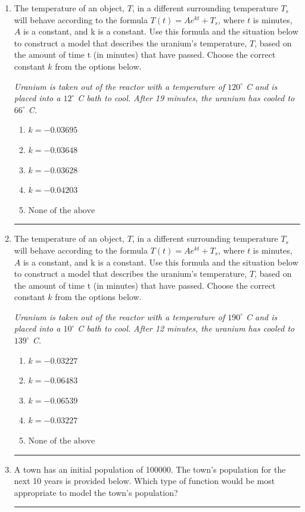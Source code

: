 \documentclass[14pt]{extbook}
\newcommand{\litem}[1]{\item#1\hspace*{-1cm}\rule{\textwidth}{0.4pt}}
\begin{document}
\begin{enumerate}
{\begin{enumerate}[label=\Alph*.]
\end{enumerate} }
\litem{
The temperature of an object, $T$, in a different surrounding temperature $T_s$ will behave according to the formula $T(t) = Ae^{kt} + T_s$, where $t$ is minutes, $A$ is a constant, and k is a constant. Use this formula and the situation below to construct a model that describes the uranium's temperature, $T$, based on the amount of time t (in minutes) that have passed. Choose the correct constant $k$ from the options below.
\begin{center}
    \textit{ Uranium is taken out of the reactor with a temperature of $120^{\circ}$ C and is placed into a $12^{\circ}$ C bath to cool. After 19 minutes, the uranium has cooled to $66^{\circ}$ C. }
\end{center}
\begin{enumerate}[label=\Alph*.]
\item \( k = -0.03695 \)
\item \( k = -0.03648 \)
\item \( k = -0.03628 \)
\item \( k = -0.04203 \)
\item \( \text{None of the above} \)

\end{enumerate} }
\litem{
The temperature of an object, $T$, in a different surrounding temperature $T_s$ will behave according to the formula $T(t) = Ae^{kt} + T_s$, where $t$ is minutes, $A$ is a constant, and k is a constant. Use this formula and the situation below to construct a model that describes the uranium's temperature, $T$, based on the amount of time t (in minutes) that have passed. Choose the correct constant $k$ from the options below.
\begin{center}
    \textit{ Uranium is taken out of the reactor with a temperature of $190^{\circ}$ C and is placed into a $10^{\circ}$ C bath to cool. After 12 minutes, the uranium has cooled to $139^{\circ}$ C. }
\end{center}
\begin{enumerate}[label=\Alph*.]
\item \( k = -0.03227 \)
\item \( k = -0.06483 \)
\item \( k = -0.06539 \)
\item \( k = -0.03227 \)
\item \( \text{None of the above} \)

\end{enumerate} }
\litem{
A town has an initial population of 100000. The town's population for the next 10 years is provided below. Which type of function would be most appropriate to model the town's population?


}
\end{enumerate}
\end{document}
